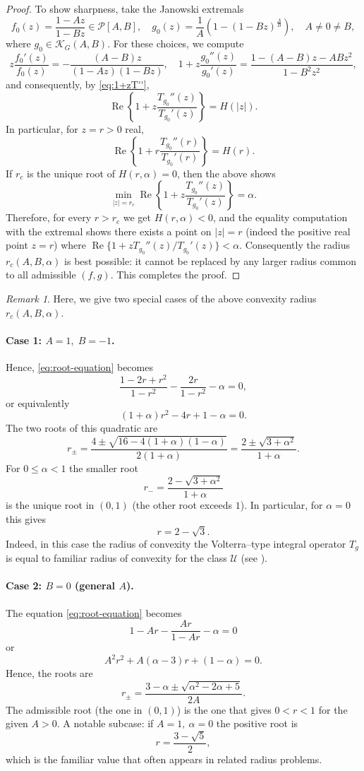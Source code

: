 \documentclass[12pt,a4paper]{amsart}
\numberwithin{equation}{section}
\theoremstyle{remark}
\newtheorem{remark}{Remark}[section]
\begin{document}
\begin{proof}
To show sharpness, take the Janowski extremals
\[
f_0(z)=\frac{1-Az}{1-Bz}\in\mathcal P[A,B],\quad g_0(z)=\frac{1}{A}\left(1-(1-Bz)^{\frac{A}{B}}\right),\quad A\neq0\neq B,
\]
where $g_0\in \mathcal{K}_G(A,B)$.
For these choices, we compute
\[
z\frac{f_0'(z)}{f_0(z)} = -\frac{(A-B)z}{(1-A z)(1-B z)},
\quad
1+z\frac{g_0''(z)}{g_0'(z)}=\frac{1-(A-B)z-AB z^2}{1-B^2 z^2},
\]
and consequently, by \eqref{eq:1+zT''},
\[
\operatorname{Re}\left\{1+z\frac{T_{g_0}''(z)}{T_{g_0}'(z)}\right\}
= H(|z|).
\]
In particular, for \(z=r>0\) real,
\[
\operatorname{Re}\left\{1+r\frac{T_{g_0}''(r)}{T_{g_0}'(r)}\right\}=H(r).
\]
If \(r_c\) is the unique root of \(H(r,\alpha)=0\), then the above shows
\[
\min_{|z|=r_c}\operatorname{Re}\left\{1+z\frac{T_{g_0}''(z)}{T_{g_0}'(z)}\right\}
=\alpha.
\]
Therefore, for every \(r>r_c\) we get \(H(r,\alpha)<0\), and the equality computation with the extremal shows there exists a point
on \(|z|=r\) (indeed the positive real point \(z=r\)) where
\(\operatorname{Re}\{1+zT_{g_0}''(z)/T_{g_0}'(z)\}<\alpha\). Consequently the radius \(r_c(A,B,\alpha)\) is best possible:
it cannot be replaced by any larger radius common to all admissible \((f,g)\). This completes the proof.
\end{proof}


\begin{remark}
    Here, we give two special cases of the above convexity radius $r_c(A,B,\alpha)$.\\
    \paragraph{\textbf{Case 1:} \(A=1,\; B=-1\).}
 Hence, \eqref{eq:root-equation} becomes
\[
\frac{1-2r+r^2}{1-r^2}-\frac{2r}{1-r^2}  - \alpha =0,
\]
or equivalently
\[
(1+\alpha) r^2 - 4r + 1-\alpha=0.
\]
The two roots of this quadratic are
\[
r_\pm=\frac{4\pm\sqrt{16-4(1+\alpha)(1-\alpha)}}{2(1+\alpha)}
=\frac{2\pm\sqrt{3+\alpha^2}}{1+\alpha}.
\]
For \(0\le\alpha<1\) the smaller root
\[
r_-=\dfrac{2-\sqrt{3+\alpha^2}}{1+\alpha}
\]
is the unique root in \((0,1)\) (the other root exceeds \(1\)). In particular, for \(\alpha=0\) this gives
\[
r=2-\sqrt3.
\]
Indeed, in this case the radius of convexity the Volterra--type integral operator $T_g$ is equal to familiar radius of convexity for the class $\mathcal{U}$ (see \cite[Theorem 2.2.22]{Graham}).\\

\paragraph{\textbf{Case 2:} \(B=0\) (general \(A\)).} The equation \eqref{eq:root-equation} becomes
\[
1-Ar-\frac{Ar}{1-Ar}-\alpha = 0
\]
or
\[
A^2 r^2 + A(\alpha-3)r + (1-\alpha) = 0.
\]
Hence, the roots are
\[
r_\pm=\frac{3-\alpha\pm\sqrt{\alpha^2-2\alpha+5}}{2A}.
\]
The admissible root (the one in \((0,1)\)) is the one that gives \(0<r<1\) for the given \(A>0\).  
A notable subcase: if \(A=1,\ \alpha=0\) the positive root is
\[
r=\frac{3-\sqrt5}{2},
\]
which is the familiar value that often appears in related radius problems.
\end{remark}
\end{document}
